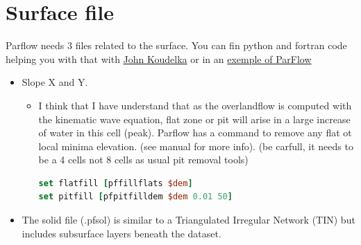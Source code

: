 \documentclass[11pt,a4paper]{report}
\begin{document}
\section{Surface file}
Parflow needs 3 files related to the surface. You can fin python and fortran code helping you with that with \href{https://www.google.ca/url?sa=t&rct=j&q=&esrc=s&source=web&cd=1&ved=0CB4QFjAA&url=https%3A%2F%2Fusu.instructure.com%2Fcourses%2F127332%2Ffiles%2F27451190%2Fdownload%3Fwrap%3D1&ei=eTeqU-O2OMqj8QHO9IDYBw&usg=AFQjCNExTTlk9AMZ1GNuJWyUoWdywQuupQ&sig2=UsFhUrcWvzURS_92v-pACA&bvm=bv.69620078,d.b2U&cad=rja}{John Koudelka} or in an \href{http://igwmc.mines.edu/short-course/ParFlow/LW_example.pdf}{exemple of ParFlow}
\begin{itemize}
\item Slope X and Y.
	\begin{itemize}
	\item I think that I have understand that as the overlandflow is computed with the kinematic wave equation, flat zone or pit will arise in a large increase of water in this cell (peak). Parflow has a command to remove any flat ot local minima elevation. (see manual for more info). (be carfull, it needs to be a 4 cells not 8 cells as usual pit removal tools)
	\begin{lstlisting}[language=TCL]
set flatfill [pffillflats $dem]
set pitfill [pfpitfilldem $dem 0.01 50]
	\end{lstlisting}
	\end{itemize}
\item The solid file (.pfsol) is similar to a
Triangulated Irregular Network (TIN) but
includes subsurface layers beneath the dataset.
\end{itemize}
\end{document}
